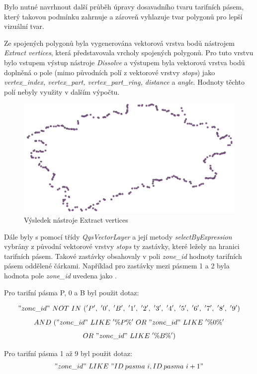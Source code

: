 Bylo nutné navrhnout další průběh úpravy dosavadního tvaru tarifních pásem, který takovou podmínku zahrnuje
a zároveň vyhlazuje tvar polygonů pro lepší vizuální tvar.  

Ze spojených polygonů byla vygenerována vektorová vrstva bodů nástrojem
\textit{Extract vertices}, která představovala vrcholy spojených polygonů. Pro tuto vrstvu
bylo vstupem výstup nástroje \textit{Dissolve} a výstupem byla vektorová vrstva bodů 
doplněná o pole (mimo původních polí z vektorové vrstvy \textit{stops}) jako \textit{vertex\_index,
vertex\_part, vertex\_part\_ring, distance} a \textit{angle}.
Hodnoty těchto polí nebyly využity v dalším výpočtu.

\begin{figure}[H] \centering
    \includegraphics[width=400pt]{./pictures/vertices-P0B.png}
    \caption[Výsledek nástroje Extract vertices]{Výsledek nástroje Extract vertices}
	\label{fig:vertices-P0B}              
\end{figure} 

Dále byly s pomocí třídy \textit{QgsVectorLayer} a její metody \textit{selectByExpression} vybrány 
z původní vektorové vrstvy \textit{stops} ty zastávky, které ležely na hranici tarifních pásem.
Takové zastávky obsahovaly v poli \textit{zone\_id} hodnoty tarifních pásem od\-dělené čárkami.
Například pro zastávky mezi pásmem 1 a 2 byla hodnota pole \textit{zone\_id} uvedena jako .

Pro tarifní pásma P, 0 a B byl použit dotaz:

\["zone\_id"\ NOT\ IN\ ('P',\ '0',\ 'B',\ '1',\ '2',\ '3',\ '4',\ '5',\ '6',\ '7',\ '8',\ '9')\]
\[AND\ ("zone\_id"\ LIKE\ '\%P\%'\ OR\ "zone\_id"\ LIKE\ '\%0\%'\]
\[OR\ "zone\_id"\ LIKE\ '\%B\%')\]

Pro tarifní pásma 1 až 9 byl použit dotaz:
\["zone\_id"\ LIKE\ "ID\: pasma\ i,ID\: pasma\ i+1"\]


